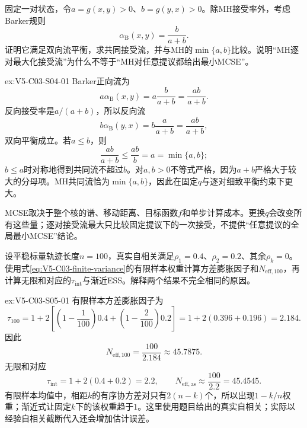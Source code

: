 \begin{SLChapterExercisePairSection}
\begin{exercise}\label{ex:V5-C03-S04-01}
固定一对状态，令$a=g(x,y)>0$、$b=g(y,x)>0$。除MH接受率外，考虑Barker规则
\[
\alpha_{\mathrm B}(x,y)=\frac{b}{a+b}.
\]
证明它满足双向流平衡，求共同接受流，并与MH的$\min\{a,b\}$比较。说明“MH逐对最大化接受流”为什么不等于“MH对任意提议都给出最小MCSE”。
\end{exercise}
\ifSLFullEdition
{}\label{sol:V5-C03-S04-01}
\begin{chapterexercisesolution}{ex:V5-C03-S04-01}
Barker正向流为
\[
a\alpha_{\mathrm B}(x,y)
=a\frac{b}{a+b}
=\frac{ab}{a+b}.
\]
反向接受率是$a/(a+b)$，所以反向流
\[
b\alpha_{\mathrm B}(y,x)
=b\frac{a}{a+b}
=\frac{ab}{a+b},
\]
双向平衡成立。若$a\le b$，则
\[
\frac{ab}{a+b}\le\frac{ab}{b}=a=\min\{a,b\};
\]
$b\le a$时对称地得到共同流不超过$b$。对$a,b>0$不等式严格，因为$a+b$严格大于较大的分母项。MH共同流恰为$\min\{a,b\}$，因此在固定$q$与逐对细致平衡约束下更大。

MCSE取决于整个核的谱、移动距离、目标函数$f$和单步计算成本。更换$q$会改变所有这些量；逐对接受流最大只比较固定提议下的一次接受，不提供“任意提议的全局最小MCSE”结论。
\end{chapterexercisesolution}
\fi

\begin{exercise}\label{ex:V5-C03-S05-01}
设平稳标量轨迹长度$n=100$，真实自相关满足$\rho_1=0.4$、$\rho_2=0.2$、其余$\rho_k=0$。使用式\eqref{eq:V5-C03-finite-variance}的有限样本权重计算方差膨胀因子和$N_{\mathrm{eff},100}$，再计算无限和对应的$\tau_{\mathrm{int}}$与渐近ESS。解释两个结果不完全相同的原因。
\end{exercise}
\ifSLFullEdition
{}\label{sol:V5-C03-S05-01}
\begin{chapterexercisesolution}{ex:V5-C03-S05-01}
有限样本方差膨胀因子为
\[
\tau_{100}
=1+2\left[\left(1-\frac1{100}\right)0.4
+\left(1-\frac2{100}\right)0.2\right]
=1+2(0.396+0.196)
=2.184.
\]
因此
\[
N_{\mathrm{eff},100}=\frac{100}{2.184}\approx45.7875.
\]
无限和对应
\[
\tau_{\mathrm{int}}=1+2(0.4+0.2)=2.2,
\qquad
N_{\mathrm{eff,as}}\approx\frac{100}{2.2}=45.4545.
\]
有限样本均值中，相距$k$的有序协方差对只有$2(n-k)$个，所以出现$1-k/n$权重；渐近式让固定$k$下的该权重趋于$1$。这里使用题目给出的真实自相关；实际以经验自相关截断代入还会增加估计误差。
\end{chapterexercisesolution}
\fi


\end{SLChapterExercisePairSection}

